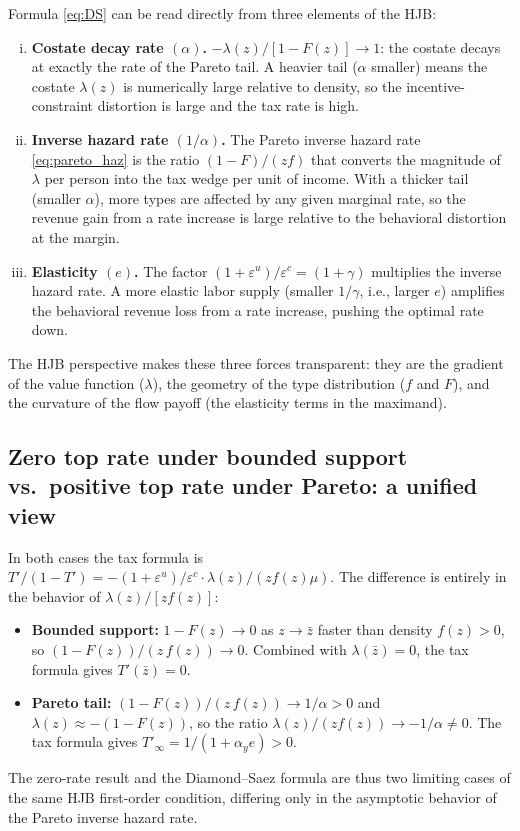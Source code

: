 \documentclass[12pt]{article}
\newcommand{\zbar}{\bar{z}}
\begin{document}
Formula \eqref{eq:DS} can be read directly from three elements of the HJB:
\begin{enumerate}[(i)]
  \item \textbf{Costate decay rate $(\alpha)$.}  $-\lambda(z)/[1-F(z)] \to 1$:
    the costate decays at exactly the rate of the Pareto tail.  A heavier tail
    ($\alpha$ smaller) means the costate $\lambda(z)$ is numerically large
    relative to density, so the incentive-constraint distortion is large and
    the tax rate is high.

  \item \textbf{Inverse hazard rate $(1/\alpha)$.}  The Pareto inverse hazard
    rate \eqref{eq:pareto_haz} is the ratio $(1-F)/(zf)$ that converts the
    magnitude of $\lambda$ per person into the tax wedge per unit of income.
    With a thicker tail (smaller $\alpha$), more types are affected by any
    given marginal rate, so the revenue gain from a rate increase is large
    relative to the behavioral distortion at the margin.

  \item \textbf{Elasticity $(e)$.}  The factor $(1+\varepsilon^u)/\varepsilon^c
    = (1+\gamma)$ multiplies the inverse hazard rate.  A more elastic labor
    supply (smaller $1/\gamma$, i.e., larger $e$) amplifies the behavioral
    revenue loss from a rate increase, pushing the optimal rate down.
\end{enumerate}
The HJB perspective makes these three forces transparent: they are the
gradient of the value function ($\lambda$), the geometry of the type
distribution ($f$ and $F$), and the curvature of the flow payoff (the
elasticity terms in the maximand).

\subsection{Zero top rate under bounded support vs.\ positive top rate under
Pareto: a unified view}

In both cases the tax formula is
$T'/(1-T') = -(1+\varepsilon^u)/\varepsilon^c \cdot \lambda(z)/(zf(z)\mu)$.
The difference is entirely in the behavior of $\lambda(z)/[zf(z)]$:
\begin{itemize}
  \item \textbf{Bounded support:}  $1-F(z) \to 0$ as $z\to\zbar$ faster
    than density $f(z) > 0$, so $(1-F(z))/(z\,f(z))\to 0$.  Combined with
    $\lambda(\zbar)=0$, the tax formula gives $T'(\zbar) = 0$.

  \item \textbf{Pareto tail:}  $(1-F(z))/(z\,f(z)) \to 1/\alpha > 0$ and
    $\lambda(z)\approx -(1-F(z))$, so the ratio $\lambda(z)/(zf(z)) \to
    -1/\alpha \neq 0$.  The tax formula gives $T'_\infty = 1/(1+\alpha_y e)>0$.
\end{itemize}
The zero-rate result and the Diamond--Saez formula are thus two limiting cases
of the same HJB first-order condition, differing only in the asymptotic
behavior of the Pareto inverse hazard rate.
\end{document}
